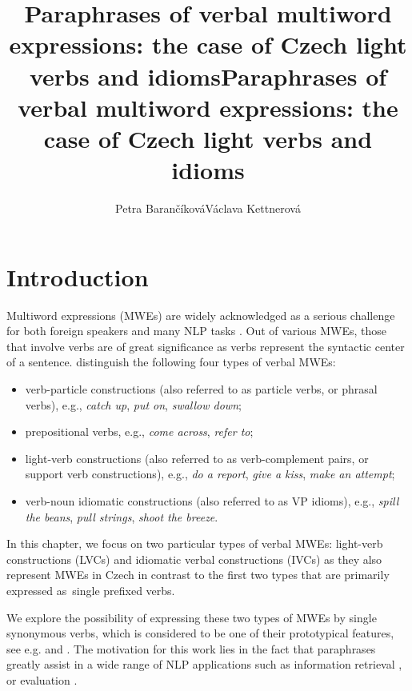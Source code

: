 \documentclass[output=paper,modfonts,nonflat]{langsci/langscibook}
\title{Paraphrases of verbal multiword expressions: the case of Czech light verbs and idioms}
\author{Petra Barančíková\affiliation{Charles University}\lastand    Václava Kettnerová\affiliation{Charles University} }
\title{Paraphrases of verbal multiword expressions: the case of Czech light verbs and idioms}
\begin{document}

\maketitle

\section{Introduction}

Multiword expressions (MWEs) are widely acknowledged as a serious challenge for 
both foreign speakers and many NLP tasks \citep{Sag2002a}. 
Out of various MWEs, those that involve verbs are of great significance 
as verbs represent the syntactic center of a sentence. \citet{baldwin2010multiword}
distinguish the following four types of verbal MWEs:

\begin{itemize}
\item 
verb-particle constructions (also referred to as particle verbs, or phrasal 
verbs), e.g., \textit{catch up}, \textit{put on}, \textit{swallow down};
\item
prepositional verbs, e.g., \textit{come across}, \textit{refer to};
\item
light-verb constructions (also referred to as verb-complement pairs, or support 
verb constructions), e.g., \textit{do a report}, \textit{give a kiss}, 
\textit{make an attempt}; %
\item
verb-noun idiomatic constructions (also referred to as VP idioms), e.g., 
\textit{spill the beans}, \textit{pull strings}, \textit{shoot the breeze}.
\end{itemize}


In this chapter, we focus on two particular types of  verbal MWEs: 
light-verb constructions (LVCs) and idiomatic verbal constructions (IVCs) as 
they also represent MWEs in Czech in contrast to the first two types that are 
primarily expressed as~single prefixed verbs. 

We explore the possibility of expressing these two types of MWEs by single 
synonymous verbs, which is considered to be one of their prototypical features, 
see e.g. \citet{chafe-68} and \citet{fillmore-88}. The motivation for this work 
lies in the fact that paraphrases greatly assist in a wide range of NLP 
applications such as information retrieval \citep{wallisinformation}, 
 \citep{Madnani:2013,Callison-Burch:2006,Marton:2009} 
or  evaluation \citep{Kauchak:2006,Zhou:2006,BaRoImprovingEvaluation2014}. 
\end{document}
